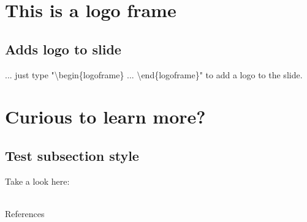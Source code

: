 \section{This is a logo frame}
\subsection{Adds logo to slide}
\begin{logoframe}

... just type "\textbackslash begin\{logoframe\} ... \textbackslash end\{logoframe\}" to add a logo to the slide.

\end{logoframe}


\section{Curious to learn more?}
\subsection{Test subsection style}
\begin{frame}

\begin{center}
Take a look here: \\~\\
\end{center}

\end{frame}
\begin{frame}[allowframebreaks]{References}
    \printbibliography
\end{frame}

